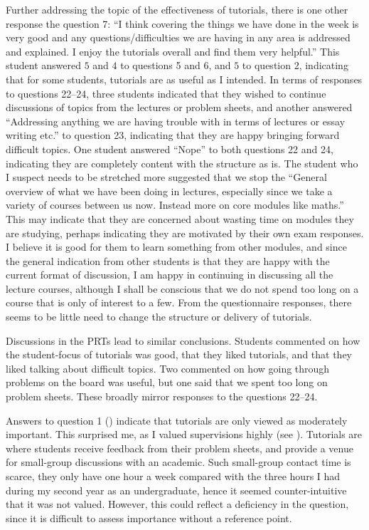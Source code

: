 Further addressing the topic of the effectiveness of tutorials, there is one other response the question 7: ``I think covering the things we have done in the week is very good and any questions/difficulties we are having in any area is addressed and explained. I enjoy the tutorials overall and find them very helpful.'' This student answered $5$ and $4$ to questions 5 and 6, and $5$ to question 2, indicating that for some students, tutorials are as useful as I intended. In terms of responses to questions 22--24, three students indicated that they wished to continue discussions of topics from the lectures or problem sheets, and another answered ``Addressing anything we are having trouble with in terms of lectures or essay writing etc.'' to question 23, indicating that they are happy bringing forward difficult topics. One student answered ``Nope'' to both questions 22 and 24, indicating they are completely content with the structure as is. The student who I suspect needs to be stretched more suggested that we stop the ``General overview of what we have been doing in lectures, especially since we take a variety of courses between us now. Instead more on core modules like maths.'' This may indicate that they are concerned about wasting time on modules they are studying, perhaps indicating they are motivated by their own exam responses. I believe it is good for them to learn something from other modules, and since the general indication from other students is that they are happy with the current format of discussion, I am happy in continuing in discussing all the lecture courses, although I shall be conscious that we do not spend too long on a course that is only of interest to a few. From the questionnaire responses, there seems to be little need to change the structure or delivery of tutorials.

Discussions in the PRTs lead to similar conclusions. Students commented on how the student-focus of tutorials was good, that they liked tutorials, and that they liked talking about difficult topics. Two commented on how going through problems on the board was useful, but one said that we spent too long on problem sheets. These broadly mirror responses to the questions 22--24.

Answers to question 1 () indicate that tutorials are only viewed as moderately important. This surprised me, as I valued supervisions highly (see ). Tutorials are where students receive feedback from their problem sheets, and provide a venue for small-group discussions with an academic. Such small-group contact time is scarce, they only have one hour a week compared with the three hours I had during my second year as an undergraduate, hence it seemed counter-intuitive that it was not valued. However, this could reflect a deficiency in the question, since it is difficult to assess importance without a reference point.

